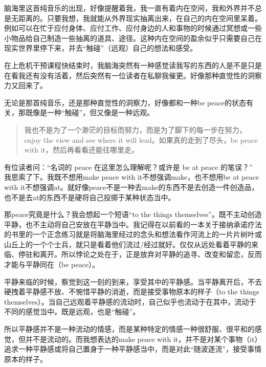 脑海里这首纯音乐的出现，好像提醒着我，我一直有着内在空间，我和外界并不总是无距离的。只要我想，我就能从外界现实抽离出来，在自己的内在空间里呆着。例如可以在忙于应付身体、应付工作、应付身边的人和事物的时候通过冥想或一些小物品给自己制造一些抽离的道具、途径。这种内在空间的盈余似乎只需要自己在现实世界里停下来，并去“触碰”（远观）自己的想法和感受。

在上危机干预课程快结束时，我脑海突然有一种感觉\pozhehao{}读我写的东西的人是不是只是在看我还有没有活着，然后突然有一位读者在私聊我催更。好像那种直觉性的洞察力又回来了。

无论是那首纯音乐，还是那种直觉性的洞察力，好像都和一种be peace的状态有关，那既像是一种“触碰”，但又像是一种远观。

\blockquote{
	我也不是为了一个渺茫的目标而努力，而是为了脚下的每一步在努力，enjoy the view and see where it will lead。如果真的走到了尽头，be peace with it，然后再看看还能往哪里走。

}

有位读者问：“名词的 peace 在这里怎么理解呢？或许是 be at peace 的笔误？” 我思索了下。我既不想用make peace with it\pozhehao{}不想强调make，也不想用be at peace with it\pozhehao{}不想强调at。就好像peace不是一种去make的东西\pozhehao{}不是去创造一件创造品，也不是去at的东西\pozhehao{}不是硬将自己投掷于某种状态当中。

那peace究竟是什么？我会想起一个短语“to the things themselves”。既不主动创造平静，也不主动将自己安放在平静当中。我记得在以前看的一本关于接纳承诺疗法的书里的一个正念练习就是将脑海里经过的念头和想法看作河流上的一片片树叶或山丘上的一个个士兵，就只是看着他们流过/经过就好。仅仅从远处看着平静的来临、停驻和离开。所以悖论之处在于，正是放弃对平静的追寻、改变和留恋，反而才能与平静同在（be peace）。

平静来临的时候，察觉到这一刻的到来，享受其中的平静感。当平静离开后，不去硬拽着平静感不放、不惋惜平静的消逝，而是接受事物原本的样子（to the things themselves）。当自己远观着平静感的流动时，自己似乎也流动于在其中，流动于不同的感觉当中。既是远观，也是“触碰”。

所以平静感并不是一种流动的情感，而是某种特定的情感\pozhehao{}一种很舒服、很平和的感觉，但并不是流动的。而我想表达的make peace with it，并不是对某个事物（it）追求一种平静感或将自己置身于一种平静感当中，而是对此“随波逐流”，接受事情原本的样子。

